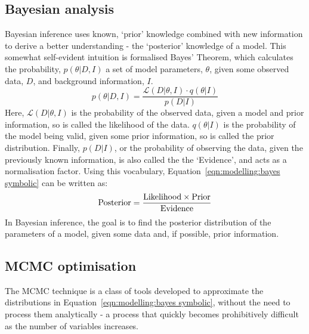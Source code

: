 \subsection{Bayesian analysis}\label{sect:modelling:Bayesian analysis}
Bayesian inference uses known, `prior' knowledge combined with new information to derive a better understanding - the `posterior' knowledge of a model. This somewhat self-evident intuition is formalised Bayes' Theorem, which calculates the probability, $p(\theta | D, I)$ a set of model parameters, $\theta$, given some observed data, $D$, and background information, $I$.
\begin{equation}
    \label{eqn:modelling:bayes symbolic}
    p(\theta | D,I) = \frac{\mathcal{L}(D | \theta, I) \cdot q(\theta | I)}{p(D|I)}
\end{equation}
Here, $\mathcal{L}(D | \theta, I)$ is the probability of the observed data, given a model and prior information, so is called the likelihood of the data.
$q(\theta|I)$ is the probability of the model being valid, given some prior information, so is called the prior distribution. Finally, $p(D | I)$, or the probability of observing the data, given the previously known information, is also called the the `Evidence', and acts as a normalisation factor. Using this vocabulary, Equation~\ref{eqn:modelling:bayes symbolic} can be written as:
\begin{equation}
    \label{eqn:modelling:bayes english}
    \rm Posterior = \frac{Likelihood \times Prior}{Evidence}
\end{equation}
In Bayesian inference, the goal is to find the posterior distribution of the parameters of a model, given some data and, if possible, prior information.


\subsection{MCMC optimisation}\label{sect:modelling:affine invariant MCMC}
The MCMC technique is a class of tools developed to approximate the distributions in Equation~\ref{eqn:modelling:bayes symbolic}, without the need to process them analytically - a process that quickly becomes prohibitively difficult as the number of variables increases.

